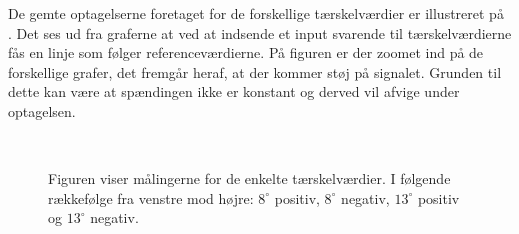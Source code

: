 De gemte optagelserne foretaget for de forskellige tærskelværdier er illustreret på . Det ses ud fra graferne at ved at indsende et input svarende til tærskelværdierne fås en linje som følger referenceværdierne. På figuren er der zoomet ind på de forskellige grafer, det fremgår heraf, at der kommer støj på signalet. Grunden til dette kan være at spændingen ikke er konstant og derved vil afvige under optagelsen. 
\begin{figure}[h]
\\[0.5cm]%
%
\caption{Figuren viser målingerne for de enkelte tærskelværdier. I følgende rækkefølge fra venstre mod højre: $8^{\circ}$ positiv, $8^{\circ}$ negativ, $13^{\circ}$ positiv og $13^{\circ}$ negativ.}
\label{fig:software_grafer}
\end{figure}

